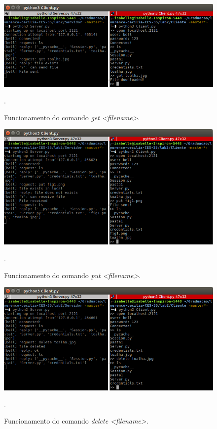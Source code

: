 \documentclass[conference]{IEEEtran}
\begin{document}
\begin{figure}[H]
\centering
\centerline{\includegraphics[scale=0.3]{prints/get1.png}}
\caption{Funcionamento do comando \textit{get <filename>}.}.
\label{get1}
\end{figure}

\begin{figure}[H]
\centering
\centerline{\includegraphics[scale=0.3]{prints/put1.png}}
\caption{Funcionamento do comando \textit{put <filename>}.}.
\label{put1}
\end{figure}

\begin{figure}[H]
\centering
\centerline{\includegraphics[scale=0.3]{prints/delete1.png}}
\caption{Funcionamento do comando \textit{delete <filename>}.}.
\label{delete1}
\end{figure}
\end{document}
